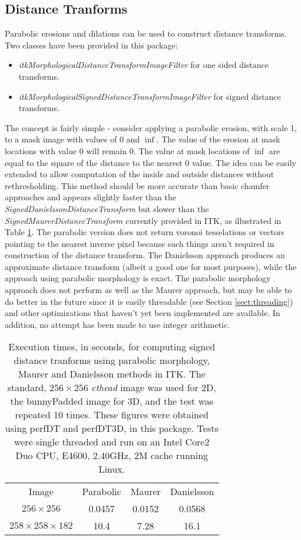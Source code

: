 \documentclass{InsightArticle}
\begin{document}
\subsection{Distance Tranforms}
Parabolic erosions and dilations can be used to construct distance
transforms. Two classes have been provided in this package:
\begin{itemize}
\item {\em itkMorphologicalDistanceTransformImageFilter} for one sided distance transforms.
\item {\em itkMorphologicalSignedDistanceTransformImageFilter} for signed distance transforms.
\end{itemize}
The concept is fairly simple - consider applying a parabolic erosion,
with scale 1, to a mask image with values of $0$ and $\inf$. The value
of the erosion at mask locations with value 0 will remain 0. The value
at mask locations of $\inf$ are equal to the square of the distance to
the nearest 0 value. The idea can be easily extended to allow
computation of the inside and outside distances without
rethresholding. This method should be more accurate than basic chamfer
approaches and appears slightly faster than the {\em
  SignedDanielssonDistanceTransform} but slower than the {\em
  SignedMaurerDistanceTransform} currently provided in ITK, as
illustrated in Table \ref{tbl:perf}. The parabolic version does not
return voronoi tesselations or vectors pointing to the nearest inverse
pixel because such things aren't required in construction of the
distance transform. The Danielsson approach produces an approximate
distance transform (albeit a good one for most purposes), while the
approach using parabolic morphology is exact. The parabolic morphology
approach does not perform as well as the Maurer approach, but may be
able to do better in the future since it is easily threadable (see
Section \ref{sect:threading}) and other optimizations that haven't yet
been implemented are available. In addition, no attempt has been made
to use integer arithmetic. 

\begin{table}[phtb]
\centering
\begin{tabular}{cccc}
\hline
Image & Parabolic & Maurer & Danielsson \\ 
$256 \times 256$ & 0.0457 & 0.0152 & 0.0568 \\
$258 \times 258 \times 182$ & 10.4  &  7.28  &  16.1 \\
\hline
\end{tabular}
\caption{Execution times, in seconds, for computing signed distance tranforms using parabolic morphology, Maurer and Danielsson methods in ITK. The standard, $256 \times 256$ {\em cthead} image was used for 2D, the bunnyPadded image for 3D, and the test was repeated 10 times. These figures were obtained using perfDT and perfDT3D, in this package. Tests were single threaded and run on an Intel Core2 Duo CPU, E4600, 2.40GHz, 2M cache running Linux.\label{tbl:perf}}
\end{table}
\end{document}
